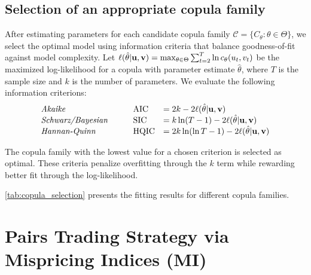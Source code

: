 \subsection{Selection of an appropriate copula family}

After estimating parameters for each candidate copula family $\mathcal{C} = \{C_\theta : \theta \in \Theta\}$, we select the optimal model using information criteria that balance goodness-of-fit against model complexity. Let $\ell(\hat{\theta}|\mathbf {u,v}) = \max_{\theta\in\Theta} \sum_{t=2}^T \ln c_{{\theta}}(u_t, v_t)$ be the maximized log-likelihood for a copula with parameter estimate $\hat{\theta}$, where $T$ is the sample size and $k$ is the number of parameters. We evaluate the following information criterions:
$$
\begin{array}{lllll}
\text{\textit{Akaike}} &&& \text{AIC} &= 2k - 2
\ell(\hat{\theta}|\mathbf {u,v})
\\
\text{\textit{Schwarz/Bayesian}} &&& \text{SIC} &= k\ln(T-1) - 2
\ell(\hat{\theta}|\mathbf {u,v})
\\
\text{\textit{Hannan-Quinn}} &&& \text{HQIC} &= 2k\ln(\ln T-1) - 2
\ell(\hat{\theta}|\mathbf {u,v})
\end{array}
$$

The copula family with the lowest value for a chosen criterion is selected as optimal. These criteria penalize overfitting through the $k$ term while rewarding better fit through the log-likelihood.
 
 
 \cref{tab:copula_selection} presents the fitting results for different copula families. 




\section{Pairs Trading Strategy via Mispricing Indices (MI)} \label{sec:mpi_strategy}

